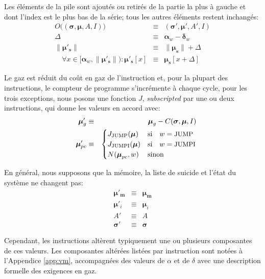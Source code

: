 \documentclass[9pt,oneside]{amsart}
\begin{document}
\begin{multicols}{2}
Les éléments de la pile sont ajoutés ou retirés de la partie la plus à gauche et dont l'index est le plus bas de la série; tous les autres éléments restent inchangés:
\begin{eqnarray}
O\big((\boldsymbol{\sigma}, \boldsymbol{\mu}, A, I)\big) & \equiv & (\boldsymbol{\sigma}', \boldsymbol{\mu}', A', I) \\
\Delta & \equiv & \mathbf{\alpha}_w - \mathbf{\delta}_w \\
\lVert\boldsymbol{\mu}'_\mathbf{s}\rVert & \equiv & \lVert\boldsymbol{\mu}_\mathbf{s}\rVert + \Delta \\
\quad \forall x \in [\mathbf{\alpha}_w, \lVert\boldsymbol{\mu}'_\mathbf{s}\rVert): \boldsymbol{\mu}'_\mathbf{s}[x] & \equiv & \boldsymbol{\mu}_\mathbf{s}[x+\Delta]
\end{eqnarray}

Le gaz est réduit du coût en gaz de l'instruction et, pour la plupart des instructions, le compteur de programme s'incrémente à chaque cycle, pour les trois exceptions, nous posons une fonction $J$, \textit{subscripted} par une ou deux instructions, qui donne les valeurs en accord avec:
\begin{eqnarray}
\quad \boldsymbol{\mu}'_{g} & \equiv & \boldsymbol{\mu}_{g} - C(\boldsymbol{\sigma}, \boldsymbol{\mu}, I) \\
\quad \boldsymbol{\mu}'_{pc} & \equiv & \begin{cases}
J_{\text{JUMP}}(\boldsymbol{\mu}) & \text{si} \quad w = \text{\small JUMP} \\
J_{\text{JUMPI}}(\boldsymbol{\mu}) & \text{si} \quad w = \text{\small JUMPI} \\
N(\boldsymbol{\mu}_{pc}, w) & \text{sinon}
\end{cases}
\end{eqnarray}

En général, nous supposons que la mémoire, la liste de suicide et l'état du système ne changent pas:
\begin{eqnarray}
\boldsymbol{\mu}'_\mathbf{m} & \equiv & \boldsymbol{\mu}_\mathbf{m} \\
\boldsymbol{\mu}'_i & \equiv & \boldsymbol{\mu}_i \\
A' & \equiv & A \\
\boldsymbol{\sigma}' & \equiv & \boldsymbol{\sigma}
\end{eqnarray}

Cependant, les instructions altèrent typiquement une ou plusieurs composantes de ces valeurs. Les composantes altérées listées par instruction sont notées à l'Appendice \ref{app:vm}, accompagnées des valeurs de $\alpha$ et de $\delta$ avec une description formelle des exigences en gaz.


\end{multicols}
\end{document}
